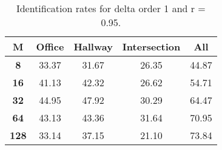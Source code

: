 \begin{table}[h]
    \small
    \centering
    \begin{tabular}{|c|c|c|c|l|}    
    \hline
    {\bf M} & {\bf Office} & {\bf Hallway} & {\bf Intersection} &     \multicolumn{1}{c|}{{\bf All}} \\ \hline
    {\bf 8} & 33.37 & 31.67 & 26.35 & 44.87 \\ \hline
    {\bf 16} & 41.13 & 42.32 & 26.62 & 54.71 \\ \hline
    {\bf 32} & 44.95 & 47.92 & 30.29 & 64.47 \\ \hline
    {\bf 64} & 43.13 & 43.36 & 31.64 & 70.95 \\ \hline
    {\bf 128} & 33.14 & 37.15 & 21.10 & 73.84 \\ \hline
    \end{tabular}
    \caption{Identification rates for delta order 1 and r = 0.95.}    
    \label{tab:identify_speakers_0.95_mit_19_1}
\end{table}
